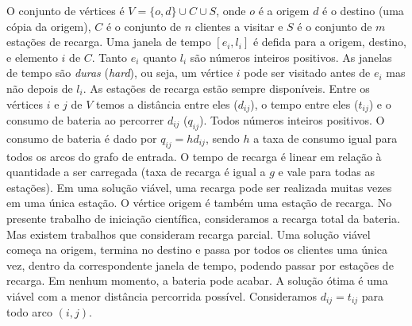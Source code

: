\documentclass{article}
\begin{document}
O conjunto de vértices é $V = \{o, d\} \cup C \cup S$, onde $o$ é a origem $d$ é o destino (uma cópia da origem), $C$ é o conjunto de $n$ clientes a visitar e $S$ é o conjunto de $m$ estações de recarga. Uma janela de tempo $[e_i, l_i]$ é defida para a origem, destino, e elemento $i$ de $C$. Tanto $e_i$ quanto $l_i$ são números inteiros positivos. As janelas de tempo são \emph{duras} ({\it hard}), ou seja, um vértice $i$ pode ser visitado antes de $e_i$ mas não depois de $l_i$. As estações de recarga estão sempre disponíveis. Entre os vértices $i$ e $j$ de $V$ temos a distância entre eles ($d_{ij}$), o tempo entre eles ($t_{ij}$) e o consumo de bateria ao percorrer $d_{ij}$ ($q_{ij}$). Todos números inteiros positivos. O consumo de bateria é dado por $q_{ij} = hd_{ij}$, sendo $h$ a taxa de consumo igual para todos os arcos do grafo de entrada. O tempo de recarga é linear em relação à quantidade a ser carregada (taxa de recarga é igual a $g$ e vale para todas as estações). Em uma solução viável, uma recarga pode ser realizada muitas vezes em uma única estação. O vértice origem é também uma estação de recarga. No presente trabalho de iniciação científica, consideramos a recarga total da bateria. Mas existem trabalhos que consideram recarga parcial. Uma solução viável começa na origem, termina no destino e passa por todos os clientes uma única vez, dentro da correspondente janela de tempo, podendo passar por estações de recarga. Em nenhum momento, a bateria pode acabar. A solução ótima é uma viável com a menor distância percorrida possível. Consideramos $d_{ij} = t_{ij}$ para todo arco $(i,j)$.
\end{document}
